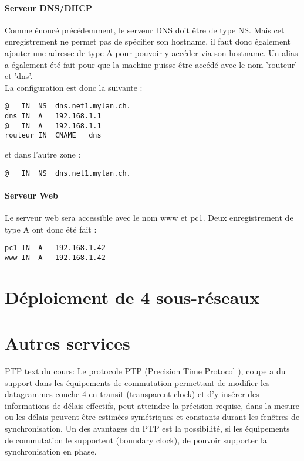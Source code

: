 \documentclass{article}
\begin{document}
\paragraph{Serveur DNS/DHCP}

Comme énoncé précédemment, le serveur DNS doit être de type NS. Mais cet enregistrement ne permet pas de spécifier son hostname, il faut donc également ajouter une adresse de type A pour pouvoir y accéder via son hostname. Un alias a également été fait pour que la machine puisse être accédé avec le nom 'routeur' et 'dns'.\\

La configuration est donc la suivante : 

\begin{lstlisting}
@	IN	NS	dns.net1.mylan.ch.
dns	IN	A	192.168.1.1
@	IN	A	192.168.1.1
routeur	IN	CNAME	dns
\end{lstlisting}

et dans l'autre zone :

\begin{lstlisting}
@	IN 	NS	dns.net1.mylan.ch.
\end{lstlisting}

\paragraph{Serveur Web}

Le serveur web sera accessible avec le nom www et pc1. Deux enregistrement de type A ont donc été fait : \\

\begin{lstlisting}
pc1	IN	A	192.168.1.42
www	IN	A	192.168.1.42
\end{lstlisting}

\section{Déploiement de 4 sous-réseaux}

\section{Autres services}

PTP text du cours:
Le protocole PTP (Precision Time Protocol ), coupe a du support dans les équipements de commutation permettant de modifier les datagrammes couche 4 en transit (transparent clock) et d'y insérer des informations de délais effectifs, peut atteindre la précision requise, dans la mesure ou les délais peuvent être estimées symétriques et constants durant les fenêtres de synchronisation. Un des avantages du
PTP est la possibilité, si les équipements de commutation le supportent (boundary clock), de pouvoir supporter la synchronisation en phase.
\end{document}
